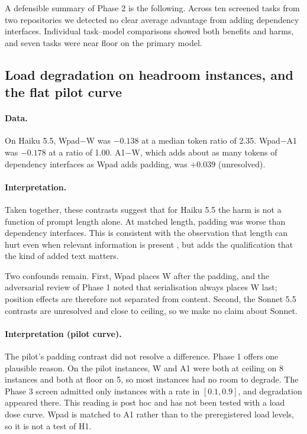 A defensible summary of Phase 2 is the following. Across ten screened tasks from two repositories we detected no clear average advantage from adding dependency interfaces. Individual task--model comparisons showed both benefits and harms, and seven tasks were near floor on the primary model.

\subsection{Load degradation on headroom instances, and the flat pilot curve}

\paragraph{Data.} On Haiku 5.5, Wpad$-$W was $-0.138$ at a median token ratio of 2.35. Wpad$-$A1 was $-0.178$ at a ratio of 1.00. A1$-$W, which adds about as many tokens of dependency interfaces as Wpad adds padding, was $+0.039$ (unresolved).

\paragraph{Interpretation.} Taken together, these contrasts suggest that for Haiku 5.5 the harm is not a function of prompt length alone. At matched length, padding was worse than dependency interfaces. This is consistent with the observation that length can hurt even when relevant information is present \cite{du2025}, but adds the qualification that the kind of added text matters.

Two confounds remain. First, Wpad places W after the padding, and the adversarial review of Phase 1 noted that serialisation always places W last; position effects \cite{liu2024} are therefore not separated from content. Second, the Sonnet 5.5 contrasts are unresolved and close to ceiling, so we make no claim about Sonnet.

\paragraph{Interpretation (pilot curve).} The pilot's padding contrast did not resolve a difference. Phase 1 offers one plausible reason. On the pilot instances, W and A1 were both at ceiling on 8 instances and both at floor on 5, so most instances had no room to degrade. The Phase 3 screen admitted only instances with a rate in $[0.1, 0.9]$, and degradation appeared there. This reading is post hoc and has not been tested with a load dose curve. Wpad is matched to A1 rather than to the preregistered load levels, so it is not a test of H1.

